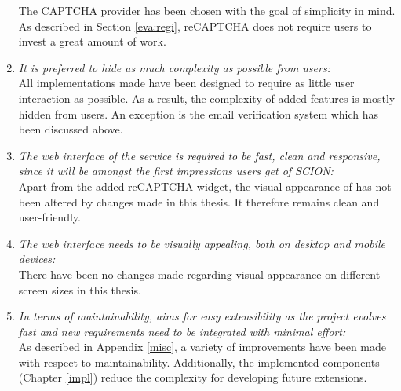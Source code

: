 \begin{enumerate}
		The CAPTCHA provider has been chosen with the goal of simplicity in mind. As described in Section \ref{eva:regi}, reCAPTCHA does not require users to invest a great amount of work.
	\item\textit{It is preferred to hide as much complexity as possible from users:}\\
		All implementations made have been designed to require as little user interaction as possible. As a result, the complexity of added features is mostly hidden from users. An exception is the email verification system which has been discussed above.
	\item\textit{The web interface of the service is required to be fast, clean and responsive, since 	it will be amongst the first impressions users get of SCION:}\\
		Apart from the added reCAPTCHA widget, the visual appearance of \lcs has not been altered by changes made in this thesis. It therefore remains clean and user-friendly.	
	\item\textit{The web interface needs to be visually appealing, both on desktop and mobile devices:}\\
		There have been no changes made regarding visual appearance on different screen sizes in this thesis.
	\item\textit{In terms of maintainability, \lcs aims for easy extensibility as the project evolves 	fast and new requirements need to be integrated with minimal effort:}\\
		As described in Appendix \ref{misc}, a variety of improvements have been made with respect to maintainability. Additionally, the implemented components (Chapter \ref{impl}) reduce the complexity for developing future extensions.
		
\end{enumerate}